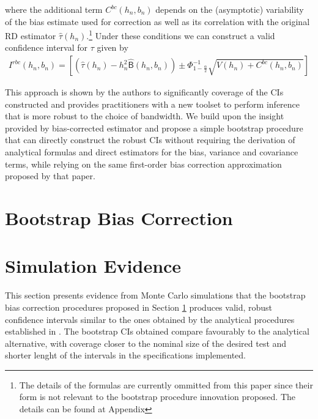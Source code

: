 \documentclass[12pt,fleqn]{article}
\begin{document}
where the additional term $C^{bc}(h_{n}, b_{n})$ depends on the (asymptotic) 
variability of the bias estimate used for correction as well as its correlation 
with the original RD estimator $\hat{\tau}(h_{n})$.\footnote{The details of the 
formulas are currently ommitted from this paper since their form is not relevant
to the bootstrap procedure innovation proposed. The details can be found at 
\cite{calonico2014} Appendix}  Under these conditions we can construct a valid 
confidence interval for $\tau$ given by
 \begin{align}
  I^{rbc}(h_{n}, b_{n})=\left[\left(\hat{\tau}(h_{n})-h_{n}^{2}\hat{\mathsf{B}}
  (h_{n},b_{n})\right)\pm \Phi^{-1}_{1-\frac{\alpha}{2}}\sqrt{V(h_{n})+C^{bc}
  (h_{n}, b_{n})} \right]
 \end{align}

This approach is shown by the authors to significantly coverage of the CIs 
constructed and provides practitioners with a new toolset to perform inference 
that is more robust to the choice of bandwidth. We build upon the insight 
provided by \cite{calonico2014} bias-corrected estimator and propose a simple 
bootstrap procedure that can directly construct the robust CIs without requiring
the derivation of analytical formulas and direct estimators for the bias, 
variance and covariance terms, while relying on the same first-order bias 
correction approximation proposed by that paper.

\section{Bootstrap Bias Correction}\label{boot}

\section{Simulation Evidence}\label{sim}
This section presents evidence from Monte Carlo simulations that the bootstrap 
bias correction procedures proposed in Section \ref{boot} produces valid, robust
confidence intervals similar to the ones obtained by the analytical procedures 
established in \cite{calonico2014}. The bootstrap CIs obtained compare favourably
to the analytical alternative, with coverage closer to the nominal size of the 
desired test and shorter lenght of the intervals in the specifications implemented.
\end{document}
